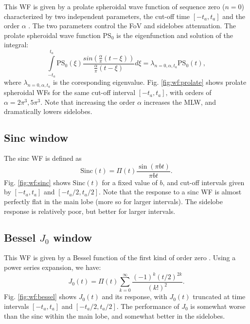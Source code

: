 \documentclass[useAMS,usenatbib]{mn2e}
\begin{document}
This WF is given by a prolate spheroidal wave function of sequence zero ($n=0$) characterized
by two independent parameters, the cut-off time $[-t_a,t_a]$ and the order $\alpha$ 
\citep{delsarte1985discrete, walter2006prolate}. 
The two parameters control the  FoV and sidelobes attenuation.
The prolate spheroidal wave function $\mathrm{PS}_0$ is the eigenfunction and solution of the integral:
\begin{equation}
\int\limits_{-t_a}^{t_a} \mathrm{PS}_{0}(\xi) \frac{sin(\frac{\alpha}{\pi}(t-\xi))}{\frac{\alpha}{\pi}(t-\xi)}d\xi=\lambda_{n=0,\alpha,t_a}\mathrm{PS}_{0}(t), 
\end{equation}
where $\lambda_{n=0,\alpha,t_a}$ is the coresponding eigenvalue. Fig. \ref{fig:wf:prolate} shows prolate 
spheroidal WFs for the same cut-off interval $[-t_a,t_a]$, with orders of $\alpha=2\pi^3, 5\pi^3$. 
Note that increasing the order $\alpha$ increases the MLW, and dramatically lowers sidelobes.

\subsection{Sinc window}


The sinc WF is defined as 
\begin{equation}
\mathrm{Sinc}(t)= \Pi(t) \frac{\sin(\pi b t)}{\pi b t} .
\end{equation}
Fig. \ref{fig:wf:sinc} shows $\mathrm{Sinc}(t)$ for a fixed value of $b$, and cut-off intervals given 
by $[-t_a,t_a]$ and $[-t_a/2,t_a/2]$. Note that the response to a sinc WF is almost perfectly flat in the main lobe (more so for larger intervals). The sidelobe response is relatively poor, but better for larger intervals.

\subsection{Bessel $J_0$ window}
\label{Bessel}

This WF is given by a Bessel function of the first kind of order zero \citep{watson1995treatise}. Using a power series expansion, we have:
\begin{equation}
J_0(t) = \Pi(t) \sum_{k=0}^{\infty}\frac{(-1)^k (t/2)^{2k}}{(k!)^2}.
\end{equation}
Fig. \ref{fig:wf:bessel} shows $J_0(t)$ and its response, with $J_0(t)$ truncated at time intervals $[-t_a,t_a]$ and 
$[-t_a/2,t_a/2]$. The performance of $J_0$ is somewhat worse than the sinc within the main lobe, and somewhat better in
the sidelobes.
\end{document}
